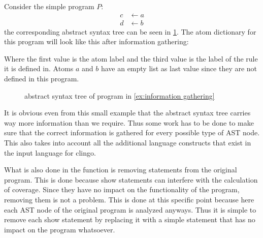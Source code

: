 \begin{example}
\label{ex:information gathering}
    Consider the simple program $P$:
    \begin{align*}
        c &\leftarrow a \\
        d &\leftarrow b
    \end{align*}
    the corresponding abstract syntax tree can be seen in \cref{fig:ast example}. The atom dictionary for this program will look like this after information gathering:
    

    Where the first value is the atom label and the third value is the label of the rule it is defined in. Atoms $a$ and $b$ have an empty list as last value since they are not defined in this program.
\end{example}

\begin{figure}[h]
    \centering
    \caption{abstract syntax tree of program in \cref{ex:information gathering}}
    \label{fig:ast example}
\end{figure}

It is obvious even from this small example that the abstract syntax tree carries way more information than we require. Thus some work has to be done to make sure that the correct information is gathered for every possible type of AST node. This also takes into account all the additional language constructs that exist in the input language for clingo.

What is also done in the  function is removing  statements from the original program. This is done because show statements can interfere with the calculation of coverage. Since they have no impact on the functionality of the program, removing them is not a problem. This is done at this specific point because here each AST node of the original program is analyzed anyways. Thus it is simple to remove each show statement by replacing it with a simple  statement that has no impact on the program whatsoever.

